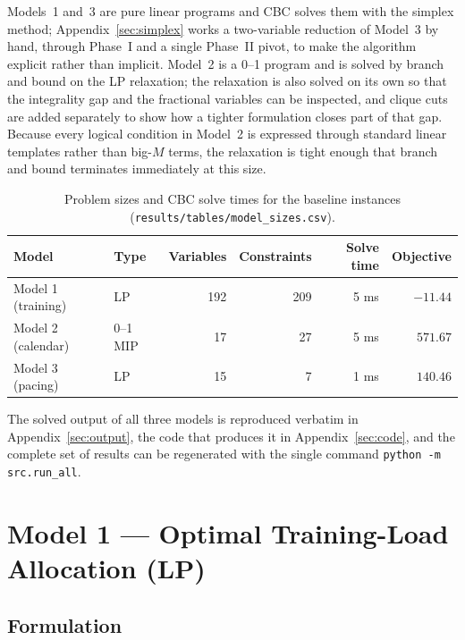 \documentclass[11pt,a4paper]{article}
\begin{document}
Models~1 and~3 are pure linear programs and CBC solves them with the simplex
method; Appendix~\ref{sec:simplex} works a two-variable reduction of Model~3 by
hand, through Phase~I and a single Phase~II pivot, to make the algorithm
explicit rather than implicit. Model~2 is a 0--1 program and is solved by
branch and bound on the LP relaxation; the relaxation is also solved on its own
so that the integrality gap and the fractional variables can be inspected, and
clique cuts are added separately to show how a tighter formulation closes part
of that gap. Because every logical condition in Model~2 is expressed through
standard linear templates rather than big-$M$ terms, the relaxation is tight
enough that branch and bound terminates immediately at this size.

\begin{table}[h]
\centering\small
\begin{tabular}{llrrrr}
\toprule
Model & Type & Variables & Constraints & Solve time & Objective\\
\midrule
Model 1 (training) & LP & 192 & 209 & 5 ms & $-11.44$\\
Model 2 (calendar) & 0--1 MIP & 17 & 27 & 5 ms & $571.67$\\
Model 3 (pacing) & LP & 15 & 7 & 1 ms & $140.46$\\
\bottomrule
\end{tabular}
\caption{Problem sizes and CBC solve times for the baseline instances
(\texttt{results/tables/model\_sizes.csv}).}
\label{tab:sizes2}
\end{table}

The solved output of all three models is reproduced verbatim in
Appendix~\ref{sec:output}, the code that produces it in
Appendix~\ref{sec:code}, and the complete set of results can be regenerated
with the single command \texttt{python -m src.run\_all}.

\section{Model 1 --- Optimal Training-Load Allocation (LP)}

\subsection{Formulation}
\end{document}
